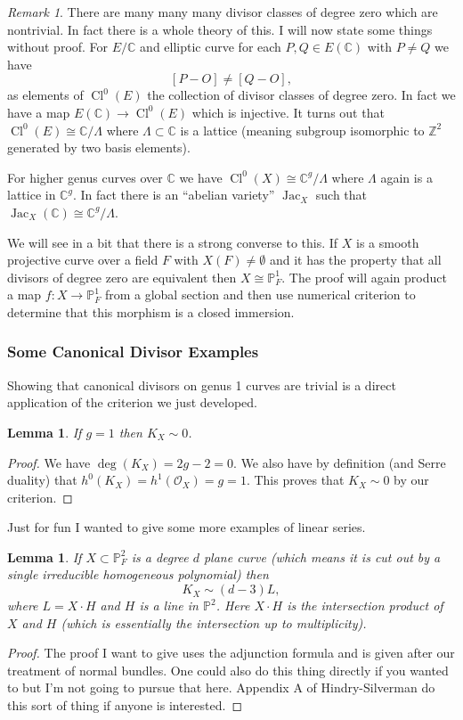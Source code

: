 \documentclass[12pt]{article}
\numberwithin{equation}{section}
\newtheorem{lemma}[theorem]{Lemma}
\theoremstyle{definition}
\theoremstyle{remark}
\newtheorem{remark}[theorem]{Remark}
\newcommand{\CC}{\mathbb{C}}
\newcommand{\ZZ}{\mathbb{Z}}
\newcommand{\Ocal}{\mathcal{O}}
\newcommand{\PP}{\mathbb{P}}
\newcommand{\Cl}{\operatorname{Cl}}
\newcommand{\Jac}{\operatorname{Jac}}
\begin{document}
	\begin{remark}
		There are many many many divisor classes of degree zero which are nontrivial. 
		In fact there is a whole theory of this. 
		I will now state some things without proof.
		For $E/\CC$ and elliptic curve for each $P,Q\in E(\CC)$ with $P\neq Q$ we have  
		 $$ [P-O] \neq [Q-O], $$
		as elements of $\Cl^0(E)$ the collection of divisor classes of degree zero. 
		In fact we have a map $E(\CC) \to \Cl^0(E)$ which is injective. 
		It turns out that $\Cl^0(E) \cong \CC/\Lambda$ where $\Lambda\subset \CC$ is a lattice (meaning subgroup isomorphic to $\ZZ^2$ generated by two basis elements). 
		
		For higher genus curves over $\CC$ we have $\Cl^0(X) \cong \CC^g/\Lambda$ where $\Lambda$ again is a lattice in $\CC^g$. 
		In fact there is an ``abelian variety'' $\Jac_X$ such that $\Jac_X(\CC)\cong \CC^g/\Lambda$.
	\end{remark}

We will see in a bit that there is a strong converse to this. 
If $X$ is a smooth projective curve over a field $F$ with $X(F)\neq \emptyset$ and it has the property that all divisors of degree zero are equivalent then $X\cong \PP^1_F$. 
The proof will again product a map $f:X \to \PP^1_F$ from a global section and then use numerical criterion to determine that this morphism is a closed immersion.

\subsubsection{Some Canonical Divisor Examples}

Showing that canonical divisors on genus 1 curves are trivial is a direct application of the criterion we just developed. 
\begin{lemma}
	If $g=1$ then $K_X\sim 0$. 
\end{lemma}
\begin{proof}
	We have $\deg(K_X) =2g-2=0$. 
	We also have by definition (and Serre duality) that $h^0(K_X)=h^1(\Ocal_X)=g=1$.
	This proves that $K_X\sim 0$ by our criterion.
\end{proof}

Just for fun I wanted to give some more examples of linear series. 
\begin{lemma}
	If $X\subset \PP^2_F$ is a degree $d$ plane curve (which means it is cut out by a single irreducible homogeneous polynomial) then 
	$$K_X\sim (d-3) L, $$
	where $L = X\cdot H$ and $H$ is a line in $\PP^2$.
	Here $X\cdot H$ is the intersection product of $X$ and $H$ (which is essentially the intersection up to multiplicity). 
\end{lemma}
\begin{proof}
	The proof I want to give uses the adjunction formula and is given after our treatment of normal bundles.
	One could also do this thing directly if you wanted to but I'm not going to pursue that here.
	Appendix A of Hindry-Silverman do this sort of thing if anyone is interested.
\end{proof}
\end{document}
